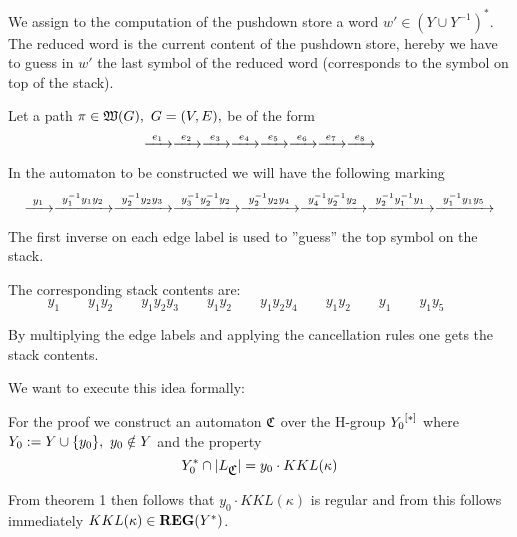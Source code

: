 We assign to the computation of the pushdown store a word $w' \in (Y\cup
Y^{-1})^*$. The reduced word is the current content of the pushdown store,
hereby we have to guess in $w'$ the last symbol of the reduced word
(corresponds to the symbol on top of the stack).

Let a path $\pi \in \pathcat{G},\ G=(V,E),$ be of the form
\[ \xrightarrow{\ {e_1}\ } \xrightarrow{\ {e_2}\ } \xrightarrow{\ {e_3}\ } \xrightarrow{\ {e_4}\ } \xrightarrow{\ {e_5}\ } \xrightarrow{\ {e_6}\ } \xrightarrow{\ {e_7}\ }
\xrightarrow{\ {e_8}\ } \]

In the automaton to be constructed we will have the following marking
\[ \xrightarrow{\ {y_1}\ } \xrightarrow{\ {y_1^{-1} y_1 y_2}\ } \xrightarrow{\ {y_2^{-1} y_2 y_3}\ } \xrightarrow{\ {y_3^{-1}
y_2^{-1} y_2}\ } \xrightarrow{\ {y_2^{-1} y_2 y_4}\ } \xrightarrow{\ {y_4^{-1} y_2^{-1} y_2}\ }
\xrightarrow{\ {y_2^{-1} y_1^{-1} y_1}\ } \xrightarrow{\ {y_1^{-1} y_1 y_5}\ }
\]

The first inverse on each edge label is used to ''guess'' the top symbol on
the stack.

The corresponding stack contents are:
\[ y_1 \qquad y_1 y_2 \qquad y_1 y_2 y_3 \qquad y_1 y_2 \qquad y_1 y_2 y_4
\qquad y_1 y_2 \qquad y_1 \qquad y_1 y_5 \qquad \]

By multiplying the edge labels and applying the cancellation rules one gets the
stack contents.

We want to execute this idea formally:

For the proof we construct an automaton $\mbox{$\mathfrak{C}$}$ over the H-group $\mbox{${Y_0}^{[*]}$}$
where $Y_0 := Y \cup \mbox{$\{y_0\}$},\ y_0 \notin Y$ and the property
\[ Y_0^* \cap |L_{\mbox{$\mathfrak{C}$}}| = y_0 \cdot KKL(\kappa) \]

From theorem 1 then follows that $y_0 \cdot KKL(\kappa)$ is regular and from
this follows immediately $KKL(\kappa) \in \mbox{{\bf REG}}(Y^*)$.


